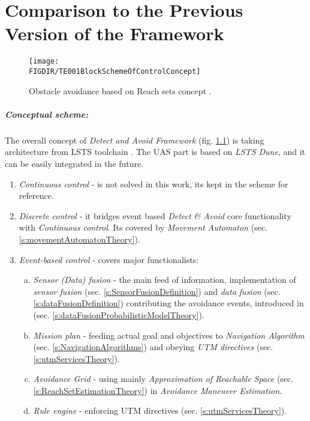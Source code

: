 \cleardoublepage

\chapter{Comparison to the Previous Version of the Framework}
\begin{figure}[H]
    \centering
    \texttt{[image: \\FIGDIR/TE001BlockSchemeOfControlConcept]} 
    \caption{Obstacle avoidance based on Reach sets concept \cite{gomola2017obstacle}.}
    \label{fig:avoidanceConcept}
\end{figure}

\paragraph{Conceptual scheme:} The overall concept of \emph{Detect and Avoid Framework} (fig. \ref{fig:avoidanceConcept}) is taking architecture from LSTS toolchain \cite{pinto2013lsts,pinto2012implementation}. The UAS part is based on \emph{LSTS Dune}, and it can be easily integrated in the future. 

\begin{enumerate}
    \item \emph{Continuous control} - is not solved in this work, its kept in the scheme for reference. 
    
    \item \emph{Discrete control} - it bridges event based \emph{Detect \& Avoid} core functionality with \emph{Continuous control}. Its covered by \emph{Movement Automaton} (sec. \ref{s:movementAutomatonTheory}).

   
    \item \emph{Event-based control} - covers major functionalists:    
    \begin{enumerate}[a.]
        \item \emph{Sensor (Data) fusion} - the main feed of information, implementation of \emph{sensor fusion} (sec. \ref{s:SensorFusionDefinition}) and \emph{data fusion} (sec. \ref{s:dataFusionDefinition}) contributing the avoidance events, introduced in (sec. \ref{s:dataFusionProbabilisticModelTheory}).
        
        \item \emph{Mission plan} - feeding actual goal and objectives to \emph{Navigation Algorithm} (sec. \ref{s:NavigationAlgorithms}) and obeying \emph{UTM directives} (sec. \ref{s:utmServicesTheory}).
        
        \item \emph{Avoidance Grid}  - using mainly \emph{Approximation of Reachable Space} (sec. \ref{s:ReachSetEstimationTheory}) in \emph{Avoidance Maneuver Estimation}.
        
        \item \emph{Rule engine} - enforcing UTM directives (sec. \ref{s:utmServicesTheory}).
    \end{enumerate}
    
\end{enumerate}

